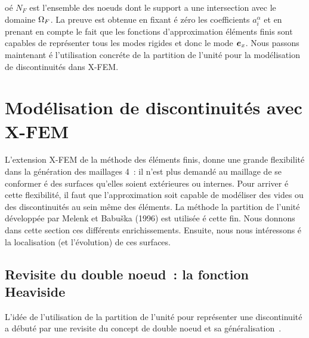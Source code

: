 o\'e $N_F$ est l'ensemble des noeuds dont le support a une
intersection avec le domaine ${\Omega}_F$.
La preuve est obtenue en fixant \'e z\'ero
les coefficients $a_i^\alpha$ et en prenant en compte
le fait que les fonctions d'approximation \'el\'ements finis
sont capables de repr\'esenter tous les modes rigides et
donc le mode $\mbox{\boldmath $e$}_x$.
Nous passons maintenant \'e l'utilisation concr\'ete
de la partition de l'unit\'e pour
la mod\'elisation de discontinuit\'es dans X-FEM.





\section{Mod\'elisation de discontinuit\'es avec X-FEM}
\label{sec:model-de-disc}
L'extension X-FEM de la m\'ethode des \'el\'ements finis,
donne une grande
flexibilit\'e dans la g\'en\'eration des maillages  4~:
il n'est plus demand\'e au maillage de se conformer \'e des surfaces
qu'elles soient ext\'erieures ou internes. Pour arriver \'e cette
flexibilit\'e,
il faut que l'approximation soit capable de mod\'eliser des vides ou
des discontinuit\'es au sein m\^eme des \'el\'ements. La m\'ethode la
partition de l'unit\'e d\'evelopp\'ee par Melenk et Babu\v{s}ka (1996)
est utilis\'ee \'e cette fin. Nous donnons dans cette section ces
diff\'erents enrichissements. Ensuite, nous nous int\'eressons \'e la
localisation (et l'\'evolution) de ces surfaces.



\subsection{Revisite du double noeud~: la fonction Heaviside}

L'id\'ee de l'utilisation de la partition de l'unit\'e pour repr\'esenter une
discontinuit\'e a d\'ebut\'e par une revisite du
concept de double noeud et sa g\'en\'eralisation~\cite{Moes:discont}.



